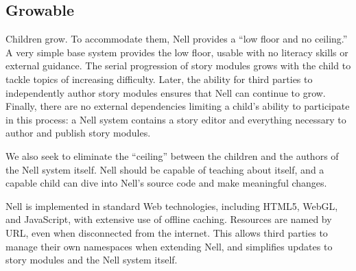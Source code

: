 \documentclass[preprint]{sig-alternate}
\begin{document}
\subsection{Growable}



Children grow. To accommodate them, Nell provides a ``low floor and
no ceiling.''  A very simple base system provides the low
floor, usable with no literacy skills or
external guidance.  The serial progression of story modules grows with
the child to tackle topics of increasing difficulty.
Later, the ability for third
parties to independently author story modules ensures that
Nell can continue to grow.  Finally, there are no external dependencies
limiting a child's ability to participate in this process: a Nell
system contains a story editor and everything necessary to
author and publish story modules.

We also seek to eliminate the ``ceiling'' between the children and
the authors of the Nell system itself.  Nell should be capable of
teaching about itself, and a capable child can dive into Nell's source
code and make meaningful changes.

Nell is implemented in standard Web technologies, including HTML5,
WebGL, and JavaScript, with extensive use of offline caching.
Resources are named by URL, even when disconnected from the
internet.  This allows third parties to manage their own namespaces
when extending Nell, and simplifies updates to story modules and
the Nell system itself.


\end{document}
